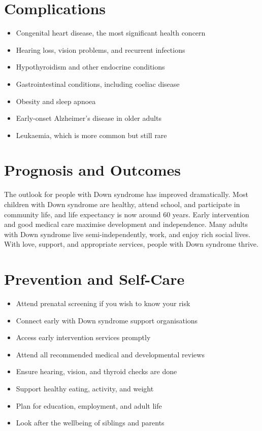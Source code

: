 \section*{Complications}
\begin{itemize}
    \item Congenital heart disease, the most significant health concern
    \item Hearing loss, vision problems, and recurrent infections
    \item Hypothyroidism and other endocrine conditions
    \item Gastrointestinal conditions, including coeliac disease
    \item Obesity and sleep apnoea
    \item Early-onset Alzheimer's disease in older adults
    \item Leukaemia, which is more common but still rare
\end{itemize}

\section*{Prognosis and Outcomes}
The outlook for people with Down syndrome has improved dramatically. Most children with Down syndrome are healthy, attend school, and participate in community life, and life expectancy is now around 60 years. Early intervention and good medical care maximise development and independence. Many adults with Down syndrome live semi-independently, work, and enjoy rich social lives. With love, support, and appropriate services, people with Down syndrome thrive.

\section*{Prevention and Self-Care}
\begin{itemize}
    \item Attend prenatal screening if you wish to know your risk
    \item Connect early with Down syndrome support organisations
    \item Access early intervention services promptly
    \item Attend all recommended medical and developmental reviews
    \item Ensure hearing, vision, and thyroid checks are done
    \item Support healthy eating, activity, and weight
    \item Plan for education, employment, and adult life
    \item Look after the wellbeing of siblings and parents
\end{itemize}

